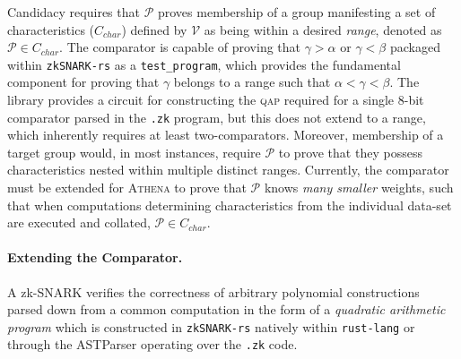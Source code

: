 \documentclass{article}
\begin{document}
				Candidacy requires that $\mathcal{P}$ proves membership of a group manifesting a set of characteristics ($C_{char}$) defined by $\mathcal{V}$ as being  within a desired \textit{range}, denoted as $\mathcal{P} \in C_{char}$. The comparator is capable of proving that $\gamma > \alpha$ or $\gamma < \beta$ packaged within \texttt{zkSNARK-rs} as a \texttt{test\_program}, which provides the fundamental component for proving that $\gamma$ belongs to a range such that $\alpha < \gamma < \beta$. The library provides a circuit for constructing the \textsc{qap} required for a single 8-bit comparator parsed in the \texttt{.zk} program, but this does not extend to a range, which inherently requires at least two-comparators. Moreover, membership of a target group would, in most instances, require $\mathcal{P}$ to prove that they possess characteristics nested within multiple distinct ranges. Currently, the comparator must be extended for \textsc{Athena} to prove that $\mathcal{P}$ knows \textit{many smaller} weights, such that when computations determining characteristics from the individual data-set are executed and collated, $\mathcal{P} \in C_{char}$.
				
\pagebreak
						
					\paragraph{Extending the Comparator.} A zk-SNARK verifies the correctness of arbitrary polynomial constructions parsed down from a common computation in the form of a \textit{quadratic arithmetic program} which is constructed in \texttt{zkSNARK-rs} natively within \texttt{rust-lang} or through the ASTParser operating over the \texttt{.zk} code. 
				
		
\end{document}
